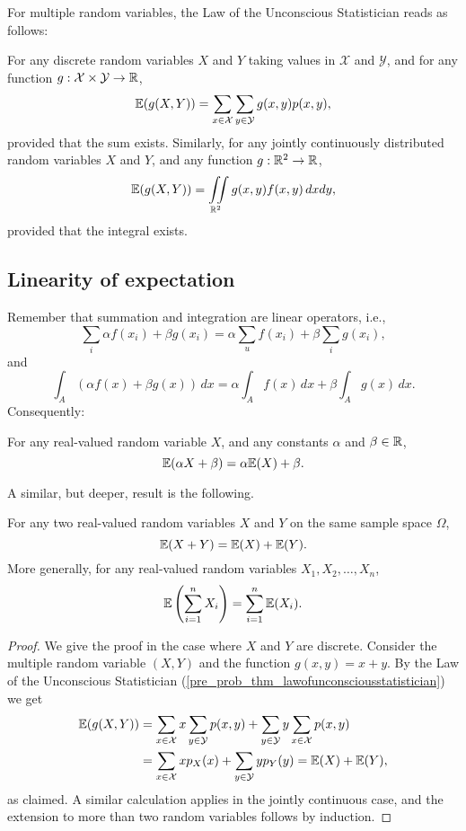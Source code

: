 \documentclass[10pt, a4paper]{article}
\begin{document}
For multiple random variables,
the Law of the Unconscious Statistician reads as follows:
\begin{theorem}
    For any discrete random variables $X$ and $Y$ taking values in $\mathcal{X}$ and $\mathcal{Y}$,
    and for any function $g : \mathcal{X} \times \mathcal{Y} \rightarrow \mathbb{R}$,
    \[
    \mathbb{E}(g(X, Y)) = \sum_{x \in \mathcal{X}}\sum_{y \in \mathcal{Y}}g(x, y)p(x, y),
    \]
    provided that the sum exists.
    Similarly,
    for any jointly continuously distributed random variables $X$ and $Y$,
    and any function $g : \mathbb{R} ^ 2 \rightarrow \mathbb{R}$,
    \[
    \mathbb{E}(g(X, Y)) = \iint\limits_{\mathbb{R} ^ 2}g(x, y)f(x, y)\,dxdy,
    \]
    provided that the integral exists.
\end{theorem}

\subsection{Linearity of expectation}
Remember that summation and integration are linear operators,
i.e.,
\[
\sum_{i}\alpha f(x_i) + \beta g(x_i) = \alpha\sum_{u}f(x_i) + \beta\sum_{i}g(x_i),
\]
and
\[
\int_A(\alpha f(x) + \beta g(x))\,dx = \alpha\int_Af(x)\,dx + \beta\int_Ag(x)\,dx.
\]
Consequently:
\begin{theorem}
    For any real-valued random variable $X$,
    and any constants $\alpha$ and $\beta \in \mathbb{R}$,
    \[
    \mathbb{E}(\alpha X + \beta) = \alpha\mathbb{E}(X) + \beta.
    \]
\end{theorem}
A similar,
but deeper,
result is the following.
\begin{theorem}
    For any two real-valued random variables $X$ and $Y$ on the same sample space $\Omega$,
    \[
    \mathbb{E}(X + Y) = \mathbb{E}(X) + \mathbb{E}(Y).
    \]
    More generally,
    for any real-valued random variables $X_1, X_2, \dotsc, X_n$,
    \[
    \mathbb{E}\left(\sum_{i = 1}^{n}X_i\right) = \sum_{i = 1}^{n}\mathbb{E}(X_i).
    \]
    \begin{proof}
        We give the proof in the case where $X$ and $Y$ are discrete.
        Consider the multiple random variable $(X, Y)$ and the function $g(x, y) = x + y$.
        By the Law of the Unconscious Statistician
        (\autoref{pre_prob_thm_lawofunconsciousstatistician})
        we get
        \begin{align*}
            \mathbb{E}(g(X, Y)) &= \sum_{x \in \mathcal{X}}x\sum_{y \in \mathcal{Y}}p(x, y) + \sum_{y \in \mathcal{Y}}y\sum_{x \in \mathcal{X}}p(x, y) \\
            &= \sum_{x \in \mathcal{X}}xp_X(x) + \sum_{y \in \mathcal{Y}}yp_Y(y) = \mathbb{E}(X) + \mathbb{E}(Y),
        \end{align*}
        as claimed.
        A similar calculation applies in the jointly continuous case,
        and the extension to more than two random variables follows by induction.
    \end{proof}
\end{theorem}
\end{document}
